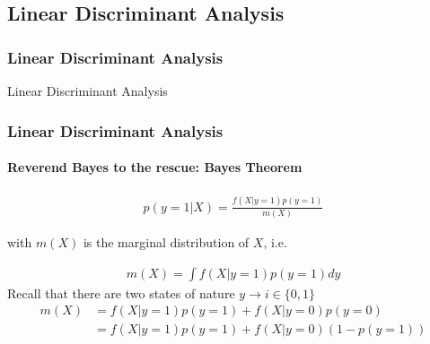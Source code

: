 \documentclass[
  shownotes,
  xcolor={svgnames},
  hyperref={colorlinks,citecolor=DarkBlue,linkcolor=DarkRed,urlcolor=DarkBlue}
  , aspectratio=169]{beamer}
\begin{document}
\subsection{Linear Discriminant Analysis}
\begin{frame}[fragile]
\frametitle{Linear Discriminant Analysis}


\centering
{\huge \textcolor{andesred}{Linear Discriminant Analysis}}


\end{frame}
\begin{frame}[fragile]
\frametitle{Linear Discriminant Analysis}
\framesubtitle{Reverend Bayes to the rescue: Bayes Theorem}

\bigskip
\begin{align}
p (y=1|X)=\frac{f(X|y=1)p(y=1)}{m(X)}
\end{align}

\bigskip
with $m(X)$ is the marginal distribution of $X$, i.e.

\begin{align}
m(X)=\int f(X|y=1)p(y=1)dy
\end{align}
Recall that there are two states of nature $y \rightarrow i\in\{0,1\}$
\begin{align}
m(X) &= f(X|y=1)p(y=1) + f(X|y=0)p(y=0) \nonumber \\
    &= f(X|y=1)p(y=1) + f(X|y=0)(1-p(y=1))
\end{align}

\end{frame}
\end{document}
